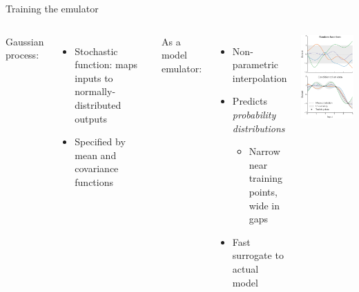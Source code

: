 \documentclass{beamer}
\begin{document}
\begin{frame}{Training the emulator}
  \vspace{1em}
  \begin{columns}[c]
    Gaussian process:
    \begin{itemize}
      \item Stochastic function: maps inputs to normally-distributed outputs
      \item Specified by mean and covariance functions
    \end{itemize}
    \bigskip
    As a model emulator:
    \begin{itemize}
      \item Non-parametric interpolation
      \item Predicts \emph{probability distributions}
        \begin{itemize}
          \item Narrow near training points, \\ wide in gaps
        \end{itemize}
      \item Fast surrogate to actual model
    \end{itemize}
    \includegraphics{gp}
  \end{columns}
\end{frame}
\end{document}
